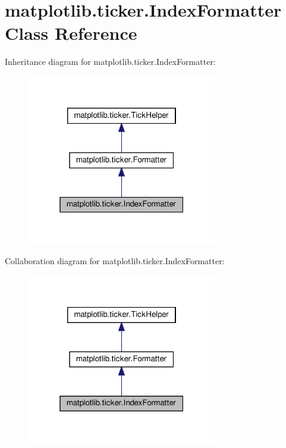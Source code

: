 \hypertarget{classmatplotlib_1_1ticker_1_1IndexFormatter}{}\section{matplotlib.\+ticker.\+Index\+Formatter Class Reference}
\label{classmatplotlib_1_1ticker_1_1IndexFormatter}


Inheritance diagram for matplotlib.\+ticker.\+Index\+Formatter\+:
\nopagebreak
\begin{figure}[H]
\begin{center}
\leavevmode
\includegraphics[width=235pt]{classmatplotlib_1_1ticker_1_1IndexFormatter__inherit__graph}
\end{center}
\end{figure}


Collaboration diagram for matplotlib.\+ticker.\+Index\+Formatter\+:
\nopagebreak
\begin{figure}[H]
\begin{center}
\leavevmode
\includegraphics[width=235pt]{classmatplotlib_1_1ticker_1_1IndexFormatter__coll__graph}
\end{center}
\end{figure}
